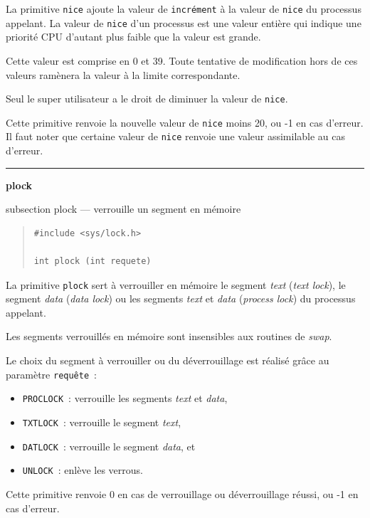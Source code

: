 \documentclass [twoside] {report}
\newcommand {\primitive} [1]
    {
	\phantomsection
	{\large \textbf {#1}}
	\addcontentsline {toc} {subsection} {#1}
    }
\newcommand {\separation}
    {
	\vspace {5mm}
	\nopagebreak
	\hrule
    }
\begin{document}
La primitive \texttt {nice} ajoute la valeur de
\texttt {incrément} à la valeur de \texttt {nice} du processus
appelant. La valeur de \texttt {nice} d'un processus est
une valeur entière qui indique une priorité
CPU d'autant plus faible que la valeur est grande.

Cette valeur est comprise en 0 et 39. Toute
tentative de modification hors de ces valeurs
ramènera la valeur à la limite correspondante.

Seul le super utilisateur a le droit de diminuer
la valeur de \texttt {nice}.

Cette primitive renvoie la nouvelle valeur de
\texttt {nice} moins 20, ou -1 en cas d'erreur. Il faut
noter que certaine valeur de \texttt {nice} renvoie une
valeur assimilable au cas d'erreur.




\separation
\primitive {plock} --- verrouille un segment en mémoire

\begin {quote}
\begin {verbatim}
#include <sys/lock.h>

int plock (int requete)
\end{verbatim}
\end {quote}

La primitive \texttt {plock} sert à verrouiller en
mémoire le segment \textit {text} (\textit {text lock}), le
segment \textit {data} (\textit {data lock}) ou les segments
\textit {text} et \textit {data} (\textit {process lock}) du processus
appelant.

Les segments verrouillés en mémoire sont
insensibles aux routines de \textit {swap}.

Le choix du segment à verrouiller ou du
déverrouillage est réalisé grâce au paramètre
\texttt {requête}~:

\begin {itemize}
    \item \texttt {PROCLOCK}~: verrouille les segments \textit {text} et \textit {data},
    \item \texttt {TXTLOCK}~: verrouille le segment \textit {text},
    \item \texttt {DATLOCK}~: verrouille le segment \textit {data}, et
    \item \texttt {UNLOCK}~: enlève les verrous.
\end {itemize}

Cette primitive renvoie 0 en cas de verrouillage
ou déverrouillage réussi, ou -1 en cas d'erreur.
\end{document}
